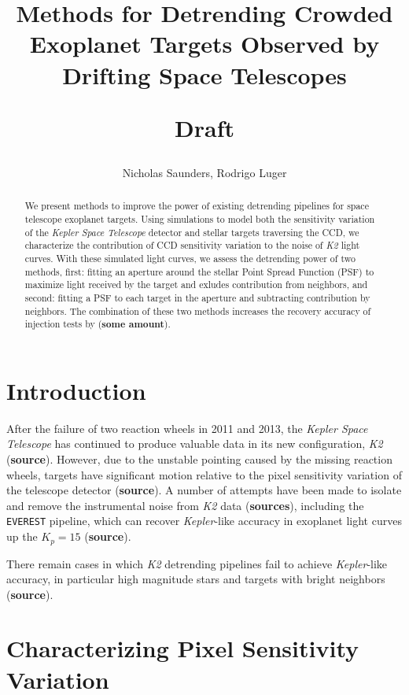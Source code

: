 \documentclass[]{article}
\title{
	Methods for Detrending Crowded Exoplanet Targets Observed by Drifting Space Telescopes
	\begin{center}
		\textbf{Draft}
	\end{center}
}
\author{Nicholas Saunders, Rodrigo Luger}
\begin{document}
\maketitle

\begin{abstract}

We present methods to improve the power of existing detrending pipelines for space telescope exoplanet targets. Using simulations to model both the sensitivity variation of the \textit{Kepler Space Telescope} detector and stellar targets traversing the CCD, we characterize the contribution of CCD sensitivity variation to the noise of \textit{K2} light curves. With these simulated light curves, we assess the detrending power of two methods, first: fitting an aperture around the stellar Point Spread Function (PSF) to maximize light received by the target and exludes contribution from neighbors, and second: fitting a PSF to each target in the aperture and subtracting contribution by neighbors. The combination of these two methods increases the recovery accuracy of injection tests by (\textbf{some amount}).

\end{abstract}

\section{Introduction}

After the failure of two reaction wheels in 2011 and 2013, the \textit{Kepler Space Telescope} has continued to produce valuable data in its new configuration, \textit{K2} (\textbf{source}). However, due to the unstable pointing caused by the missing reaction wheels, targets have significant motion relative to the pixel sensitivity variation of the telescope detector (\textbf{source}). A number of attempts have been made to isolate and remove the instrumental noise from \textit{K2} data (\textbf{sources}), including the \texttt{EVEREST} pipeline, which can recover \textit{Kepler}-like accuracy in exoplanet light curves up the $K_p = 15$ (\textbf{source}).

There remain cases in which \textit{K2} detrending pipelines fail to achieve \textit{Kepler}-like accuracy, in particular high magnitude stars and targets with bright neighbors (\textbf{source}). 

\section{Characterizing Pixel Sensitivity Variation}
\end{document}
